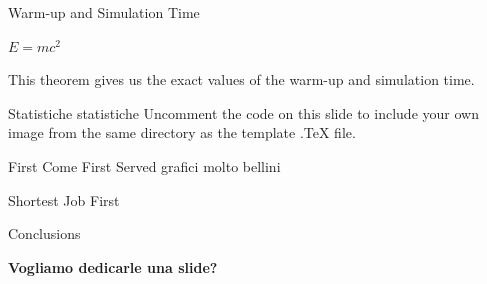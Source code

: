 \documentclass[aspectratio=169,xcolor=dvipsnames]{beamer}
\begin{document}
\begin{frame}{Warm-up and Simulation Time}
    \begin{theorem}
        $E = mc^2$
    \end{theorem}
    This theorem gives us the exact values of the warm-up and simulation time.
\end{frame}


\begin{frame}{Statistiche statistiche}
    Uncomment the code on this slide to include your own image from the same directory as the template .TeX file.
\end{frame}


\begin{frame}{First Come First Served}
    grafici molto bellini
\end{frame}


\begin{frame}{Shortest Job First}
\end{frame}


\begin{frame}{Conclusions}
    \centerline{\textbf{Vogliamo dedicarle una slide?}}
\end{frame}

\end{document}

